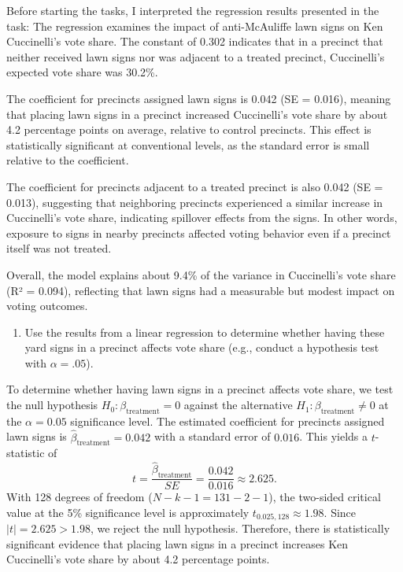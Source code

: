 \documentclass[
]{article}
\begin{document}
\newpage

Before starting the tasks, I interpreted the regression results presented in the task: The regression examines the impact of
anti-McAuliffe lawn signs on Ken Cuccinelli's vote share. The constant
of 0.302 indicates that in a precinct that neither received lawn signs
nor was adjacent to a treated precinct, Cuccinelli's expected vote share
was 30.2\%.

The coefficient for precincts assigned lawn signs is 0.042 (SE = 0.016),
meaning that placing lawn signs in a precinct increased Cuccinelli's
vote share by about 4.2 percentage points on average, relative to
control precincts. This effect is statistically significant at
conventional levels, as the standard error is small relative to the
coefficient.

The coefficient for precincts adjacent to a treated precinct is also
0.042 (SE = 0.013), suggesting that neighboring precincts experienced a
similar increase in Cuccinelli's vote share, indicating spillover
effects from the signs. In other words, exposure to signs in nearby
precincts affected voting behavior even if a precinct itself was not
treated.

Overall, the model explains about 9.4\% of the variance in Cuccinelli's
vote share (R² = 0.094), reflecting that lawn signs had a measurable but
modest impact on voting outcomes.

\vspace{.35cm}

\begin{enumerate}
	\item [(a)]
 Use the results from a linear regression to determine whether having these yard signs in a precinct affects vote share (e.g., conduct a hypothesis test with $\alpha = .05$). 
\end{enumerate}
To determine whether having lawn signs in a precinct affects
vote share, we test the null hypothesis
\(H_0: \beta_{\text{treatment}} = 0\) against the alternative
\(H_1: \beta_{\text{treatment}} \neq 0\) at the \(\alpha = 0.05\)
significance level. The estimated coefficient for precincts assigned
lawn signs is \(\hat{\beta}_{\text{treatment}} = 0.042\) with a standard
error of \(0.016\). This yields a \(t\)-statistic of \[
t = \frac{\hat{\beta}_{\text{treatment}}}{SE} = \frac{0.042}{0.016} \approx 2.625.
\] With 128 degrees of freedom (\(N - k - 1 = 131 - 2 - 1\)), the
two-sided critical value at the 5\% significance level is approximately
\(t_{0.025,128} \approx 1.98\). Since \(|t| = 2.625 > 1.98\), we reject
the null hypothesis. Therefore, there is statistically significant
evidence that placing lawn signs in a precinct increases Ken
Cuccinelli's vote share by about 4.2 percentage points.
\end{document}
